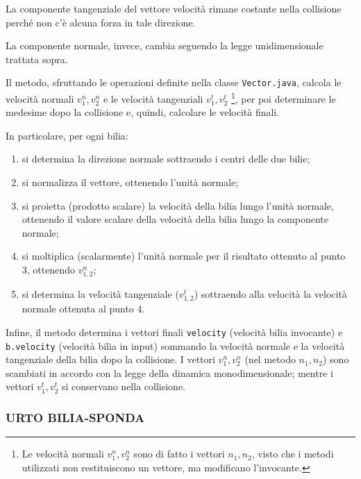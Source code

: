 \documentclass[12pt,a4paper]{report}
\begin{document}
La componente tangenziale del vettore velocità rimane costante nella collisione perché non c'è alcuna forza in tale direzione.

La componente normale, invece, cambia seguendo la legge unidimensionale trattata sopra.

\vspace{3mm}

Il metodo, sfruttando le operazioni definite nella classe \texttt{Vector.java}, calcola le velocità normali $v_1^n, v_2^n$ e le velocità tangenziali $v_1^t, v_2^t$ \footnote{Le velocità normali $v_1^n, v_2^n$ sono di fatto i vettori $n_1, n_2$, visto che i metodi utilizzati non restituiscono un vettore, ma modificano l'invocante.}, per poi determinare le medesime dopo la collisione e, quindi, calcolare le velocità finali.

In particolare, per ogni bilia:
\begin{enumerate}
	\item si determina la direzione normale sottraendo i centri delle due bilie;
	\item si normalizza il vettore, ottenendo l'unità normale;
	\item si proietta (prodotto scalare) la velocità della bilia lungo l'unità normale, ottenendo il valore scalare della velocità della bilia lungo la componente normale;
	\item si moltiplica (scalarmente) l'unità normale per il risultato ottenuto al punto 3, ottenendo $v_{1,2}^n$;
	\item si determina la velocità tangenziale ($v_{1,2}^t$) sottraendo alla velocità la velocità normale ottenuta al punto 4.
\end{enumerate}

Infine, il metodo determina i vettori finali \texttt{velocity} (velocità bilia invocante) e \texttt{b.velocity} (velocità bilia in input) sommando la velocità normale e la velocità tangenziale della bilia dopo la collisione.
I vettori $v_1^n, v_2^n$ (nel metodo $n_1, n_2$) sono scambiati in accordo con la legge della dinamica monodimensionale; mentre i vettori $v_1^t, v_2^t$ si conservano nella collisione.

\pagebreak
\subsubsection*{URTO BILIA-SPONDA} 
\end{document}
